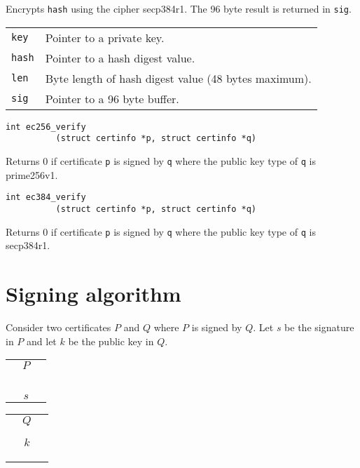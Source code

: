 \documentclass[12pt]{article}
\begin{document}
\noindent
Encrypts {\tt hash} using the cipher secp384r1.
The 96 byte result is returned in {\tt sig}.

\bigskip
\begin{tabular}{ll}
{\tt key} & Pointer to a private key.\\
{\tt hash} & Pointer to a hash digest value.\\
{\tt len} & Byte length of hash digest value (48 bytes maximum).\\
{\tt sig} & Pointer to a 96 byte buffer.
\end{tabular}

\bigskip
\bigskip
\begin{verbatim}
int ec256_verify
          (struct certinfo *p, struct certinfo *q)
\end{verbatim}

\noindent
Returns 0 if certificate {\tt p} is signed by {\tt q}
where the public key type of {\tt q} is prime256v1.

\bigskip
\bigskip
\begin{verbatim}
int ec384_verify
          (struct certinfo *p, struct certinfo *q)
\end{verbatim}

\noindent
Returns 0 if certificate {\tt p} is signed by {\tt q}
where the public key type of {\tt q} is secp384r1.

\newpage
\section{Signing algorithm}

\noindent
Consider two certificates $P$ and $Q$ where $P$ is signed by $Q$.
Let $s$ be the signature in $P$ and let $k$ be the public
key in $Q$.

\begin{center}
\begin{tabular}{|c|}
\hline
$\quad P\quad$\\
\\
\\
\\
\\
\\
\hline
$s$\\
\hline
\end{tabular}
\qquad
\begin{tabular}{|c|}
\hline
$\quad Q\quad$\\
\\
\\
\hline
$k$\\
\hline
\\
\\
\\
\hline
\end{tabular}
\end{center}
\end{document}
